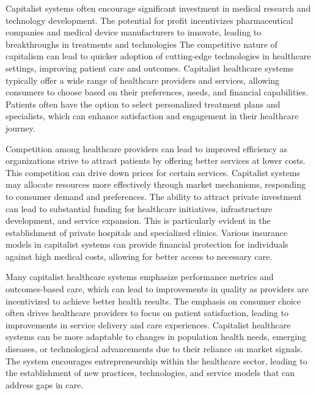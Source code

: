\par
Capitalist systems often encourage significant investment in medical research and technology development. The potential for profit incentivizes pharmaceutical companies and medical device manufacturers to innovate, leading to breakthroughs in treatments and technologies
The competitive nature of capitalism can lead to quicker adoption of cutting-edge technologies in healthcare settings, improving patient care and outcomes.
Capitalist healthcare systems typically offer a wide range of healthcare providers and services, allowing consumers to choose based on their preferences, needs, and financial capabilities.
Patients often have the option to select personalized treatment plans and specialists, which can enhance satisfaction and engagement in their healthcare journey.

\par
Competition among healthcare providers can lead to improved efficiency as organizations strive to attract patients by offering better services at lower costs. This competition can drive down prices for certain services.
Capitalist systems may allocate resources more effectively through market mechanisms, responding to consumer demand and preferences.
The ability to attract private investment can lead to substantial funding for healthcare initiatives, infrastructure development, and service expansion. This is particularly evident in the establishment of private hospitals and specialized clinics.
Various insurance models in capitalist systems can provide financial protection for individuals against high medical costs, allowing for better access to necessary care.

\par
Many capitalist healthcare systems emphasize performance metrics and outcomes-based care, which can lead to improvements in quality as providers are incentivized to achieve better health results.
The emphasis on consumer choice often drives healthcare providers to focus on patient satisfaction, leading to improvements in service delivery and care experiences.
Capitalist healthcare systems can be more adaptable to changes in population health needs, emerging diseases, or technological advancements due to their reliance on market signals.
The system encourages entrepreneurship within the healthcare sector, leading to the establishment of new practices, technologies, and service models that can address gaps in care.


